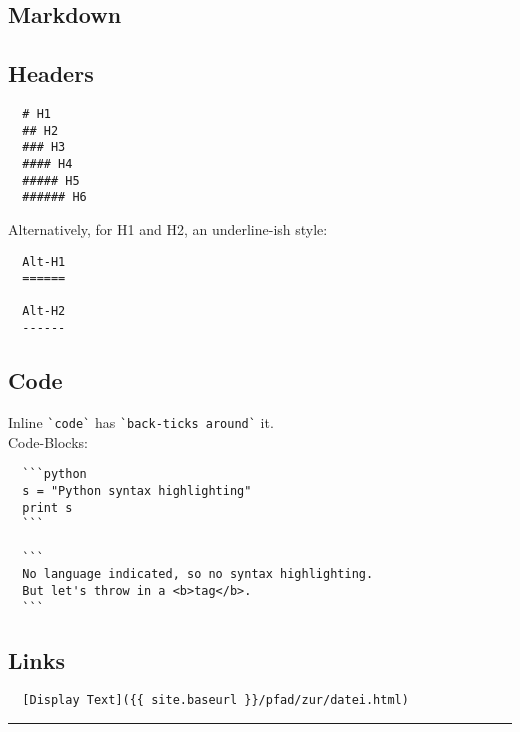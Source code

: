 \documentclass[10pt,landscape,a4paper]{CheatSheet}
\begin{document}
\begin{multicols}{4}
\section{Markdown}
\subsection{Headers}
\begin{lstlisting}
  # H1
  ## H2
  ### H3
  #### H4
  ##### H5
  ###### H6
\end{lstlisting}  
 Alternatively, for H1 and H2, an underline-ish style:
\begin{lstlisting}
  Alt-H1
  ======
  
  Alt-H2
  ------
\end{lstlisting}
\subsection{Code}
Inline \lstinline{`code`} has \lstinline{`back-ticks around`} it.\\
Code-Blocks:
\begin{lstlisting}
  ```python
  s = "Python syntax highlighting"
  print s
  ```
  
  ```
  No language indicated, so no syntax highlighting. 
  But let's throw in a <b>tag</b>.
  ```
\end{lstlisting}
\subsection{Links}
\begin{lstlisting}
  [Display Text]({{ site.baseurl }}/pfad/zur/datei.html)
\end{lstlisting}
\rule{0.3\linewidth}{0.25pt}
\scriptsize
\end{multicols}
\end{document}
